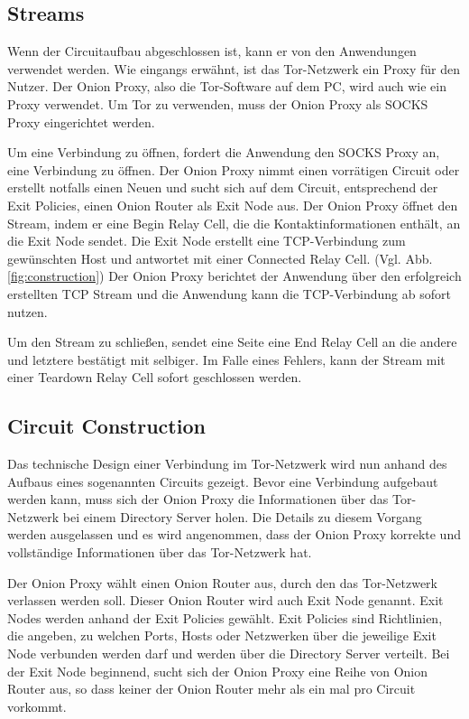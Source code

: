 \documentclass[fleqn,envcountsame,runningheads,10pt,a4paper]{llncs}
\begin{document}
\subsection{Streams}

Wenn der Circuitaufbau abgeschlossen ist, kann er von den Anwendungen verwendet 
werden. Wie eingangs erwähnt, ist das Tor-Netzwerk ein Proxy für den Nutzer. Der 
Onion Proxy, also die Tor-Software auf dem PC, wird auch wie ein Proxy 
verwendet. Um Tor zu verwenden, muss der Onion Proxy als SOCKS Proxy 
\cite{rfc:socks} eingerichtet werden.

Um eine Verbindung zu öffnen, fordert die Anwendung den SOCKS Proxy an, eine 
Verbindung zu öffnen. Der Onion Proxy nimmt einen vorrätigen Circuit oder 
erstellt notfalls einen Neuen und sucht sich auf dem Circuit, entsprechend der 
Exit Policies, einen Onion Router als Exit Node aus. Der Onion Proxy öffnet den 
Stream, indem er eine Begin Relay Cell, die die Kontaktinformationen enthält, an 
die Exit Node sendet. Die Exit Node erstellt eine TCP-Verbindung zum gewünschten 
Host und antwortet mit einer Connected Relay Cell. (Vgl. Abb. 
\ref{fig:construction}) Der Onion Proxy berichtet der Anwendung über den 
erfolgreich erstellten TCP Stream und die Anwendung kann die TCP-Verbindung ab 
sofort nutzen.

Um den Stream zu schließen, sendet eine Seite eine End Relay Cell an die andere 
und letztere bestätigt mit selbiger. Im Falle eines Fehlers, kann der Stream mit 
einer Teardown Relay Cell sofort geschlossen werden.

\subsection{Circuit Construction}
\label{sec:ciruit_construction} 

Das technische Design einer Verbindung im Tor-Netzwerk wird nun anhand des 
Aufbaus eines sogenannten Circuits gezeigt. Bevor eine Verbindung aufgebaut 
werden kann, muss sich der Onion Proxy die Informationen über das Tor-Netzwerk 
bei einem Directory Server holen. Die Details zu diesem Vorgang werden 
ausgelassen und es wird angenommen, dass der Onion Proxy korrekte und 
vollständige Informationen über das Tor-Netzwerk hat.

Der Onion Proxy wählt einen Onion Router aus, durch den das Tor-Netzwerk 
verlassen werden soll. Dieser Onion Router wird auch Exit Node genannt. Exit 
Nodes werden anhand der Exit Policies gewählt. Exit Policies  sind Richtlinien, 
die angeben, zu welchen Ports, Hosts oder Netzwerken über die jeweilige Exit 
Node verbunden werden darf und werden über die Directory Server verteilt. Bei 
der Exit Node beginnend, sucht sich der Onion Proxy eine Reihe von Onion Router 
aus, so dass keiner der Onion Router mehr als ein mal pro Circuit vorkommt.
\end{document}

